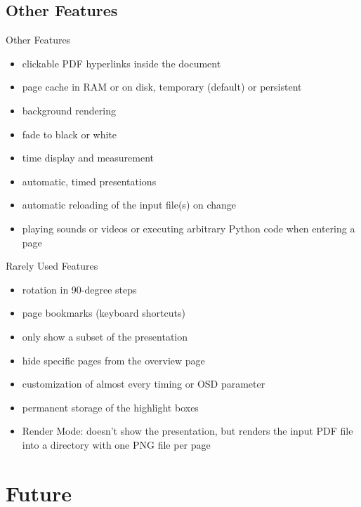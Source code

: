 \documentclass[bigger,hyperref={colorlinks=true,linkcolor=white,urlcolor=blue}]{beamer}
\begin{document}
\subsection{Other Features}
\begin{frame}{Other Features}
    \begin{itemize}
        \item clickable PDF hyperlinks inside the document
        \item page cache in RAM or on disk, temporary (default) or persistent
        \item background rendering
        \item fade to black or white
        \item time display and measurement
        \item automatic, timed presentations
        \item automatic reloading of the input file(s) on change
        \item playing sounds or videos or executing arbitrary Python code
              when entering a page
    \end{itemize}
\end{frame}
\begin{frame}{Rarely Used Features}
    \begin{itemize}
        \item rotation in 90-degree steps
        \item page bookmarks (keyboard shortcuts)
        \item only show a subset of the presentation
        \item hide specific pages from the overview page
        \item customization of almost every timing or OSD parameter
        \item permanent storage of the highlight boxes
        \item {\glqq}Render Mode{\grqq}: doesn't show the presentation, but
              renders the input PDF file into a directory with one PNG file
              per page
    \end{itemize}
\end{frame}


\section{Future}
\end{document}
